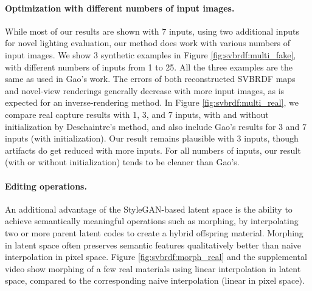 

\paragraph{Optimization with different numbers of input images.} While most of our results are shown with 7 inputs, using two additional inputs for novel lighting evaluation, our method does work with various numbers of input images. We show 3 synthetic examples in Figure \ref{fig:svbrdf:multi_fake}, with different numbers of inputs from 1 to 25. All the three examples are the same as used in Gao's work. The errors of both reconstructed SVBRDF maps and novel-view renderings generally decrease with more input images, as is expected for an inverse-rendering method. In Figure \ref{fig:svbrdf:multi_real}, we compare real capture results with 1, 3, and 7 inputs, with and without initialization by Deschaintre's method, and also include Gao's results for 3 and 7 inputs (with initialization). Our result remains plausible with 3 inputs, though artifacts do get reduced with more inputs. For all numbers of inputs, our result (with or without initialization) tends to be cleaner than Gao's.



\paragraph{Editing operations.} An additional advantage of the StyleGAN-based latent space is the ability to achieve semantically meaningful operations such as morphing, by interpolating two or more parent latent codes to create a hybrid offspring material. Morphing in latent space often preserves semantic features qualitatively better than naive interpolation in pixel space. Figure \ref{fig:svbrdf:morph_real} and the supplemental video show morphing of a few real materials using linear interpolation in latent space, compared to the corresponding naive interpolation (linear in pixel space).


